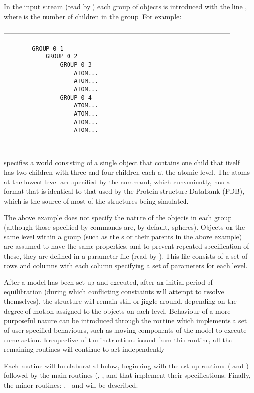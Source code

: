 In the input stream (read by )
each group of objects is introduced with the line , where  is
the number of children in the group.   For example:
\begin{singlespace}
---------------------------------------------------------------------------------------------------
\begin{verbatim}
        GROUP 0 1
            GROUP 0 2
                GROUP 0 3
                    ATOM...
                    ATOM...
                    ATOM...
                GROUP 0 4
                    ATOM...
                    ATOM...
                    ATOM...
                    ATOM...
\end{verbatim}
\ \ \ \ ---------------------------------------------------------------------------------------------------
\end{singlespace}
specifies a world consisting of a single object that contains one child that itself
has two children with three and four children each at the atomic level.  The atoms at
the lowest level are specified by the  command, which conveniently, has a
format that is identical to that used by the Protein structure DataBank (PDB), which
is the source of most of the structures being simulated.

The above example does not specify the nature of the objects in each group (although
those specified by  commands are, by default, spheres).  Objects on the same
level within a group (such as the s or their parents in the above example)
are assumed to have the same properties, and to prevent repeated specification of
these, they are defined in a parameter file (read by ).  This file consists
of a set of rows and columns with each column specifying a set of parameters for
each level.

After a model has been set-up and executed, after an initial period of equilibration
(during which conflicting constraints will attempt to resolve themselves), the structure
will remain still or jiggle around, depending on the degree of motion assigned to the
objects on each level.   Behaviour of a more purposeful nature can be introduced through
the  routine which implements a set of user-specified behaviours, such as 
moving components of the model to execute some action.   Irrespective of the instructions
issued from this routine, all the remaining routines will continue to act independently

Each routine will be elaborated below, beginning with the set-up routines (
and ) followed by the main routines (, , 
and  that implement their specifications.  Finally, the minor routines:
, ,  and  will be described.

